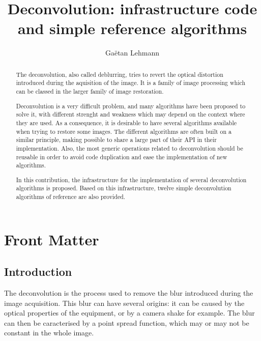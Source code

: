 \documentclass{InsightArticle}
\title{Deconvolution: infrastructure code and simple reference algorithms}
\author{Ga\"etan Lehmann}
\newcommand{\IJhandlerIDnumber}{}
\begin{document}
%
% 
\IJhandlefooter{\IJhandlerIDnumber}

\maketitle

\ifhtml
\chapter*{Front Matter\label{front}}
\fi


\begin{abstract}
\noindent
The deconvolution, also called deblurring, tries to revert the optical distortion introduced during the aquisition of the image.
It is a family of image processing which can be classed in the larger family of image restoration.

Deconvolution is a very difficult problem, and many algorithms have been proposed to solve it, with different strenght and weakness
which may depend on the context where they are used. As a consequence, it is desirable to have several algorithms available when trying
to restore some images. The different algorithms are often built on a similar principle, making possible to share a large part of their
API in their implementation. Also, the most generic operations related to deconvolution should be reusable in order to avoid code
duplication and ease the implementation of new algorithms.

In this contribution, the infrastructure for the implementation of several deconvolution algorithms is proposed. Based on this
infrastructure, twelve simple deconvolution algorithms of reference are also provided.
\end{abstract}

\IJhandlenote{\IJhandlerIDnumber}

\tableofcontents


\section{Introduction}

The deconvolution is the process used to remove the blur introduced during the image acquisition. This blur can have several
origins: it can be caused by the optical properties of the equipment, or by a camera shake for example. The blur can then be
caracterised by a point spread function, which may or may not be constant in the whole image.
\end{document}
